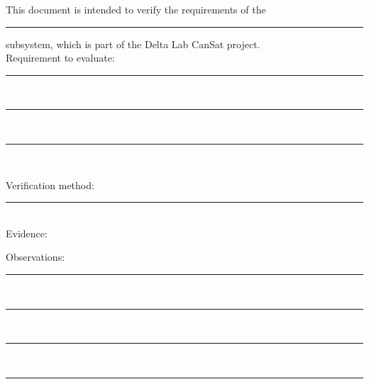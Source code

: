 \documentclass[12pts]{article}
\begin{document}
This document is intended to verify the requirements of the \rule{20mm}{0.1mm} subsystem, which is part of the Delta Lab CanSat project.\\

Requirement to evaluate:\\

\rule{160mm}{0.1mm}\\

\rule{160mm}{0.1mm}\\

\rule{160mm}{0.1mm}\\
\vspace{1cm}

Verification method: \rule{128mm}{0.1mm}\\

Evidence:\\



\vspace{10cm}

Observations: \\



\rule{160mm}{0.1mm}\\

\rule{160mm}{0.1mm}\\

\rule{160mm}{0.1mm}\\

\rule{160mm}{0.1mm}\\
\end{document}
